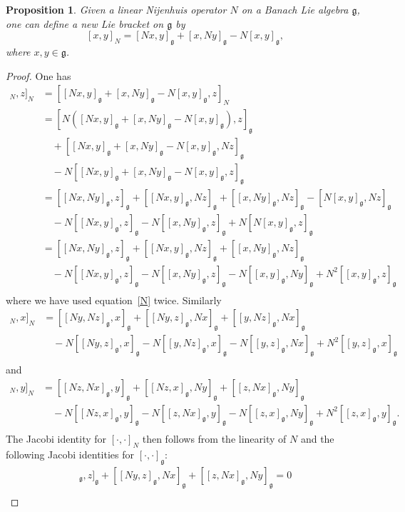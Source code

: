 \documentclass[a4paper,12pt,reqno]{amsart}%
\newtheorem{proposition}[theorem]{Proposition}
\theoremstyle{definition}
\theoremstyle{remark}
\numberwithin{theorem}{section}
\numberwithin{equation}{section}
\newcommand{\1}{{\bf 1}}
\newcommand{\g}{{\mathfrak g}}
\begin{document}
\begin{proposition}
Given a linear Nijenhuis operator $N$ on a Banach Lie algebra $\g$, one can define a new Lie bracket on $\g$ by
\begin{equation}\label{def:N}
    [x, y]_N = [Nx, y]_\g + [x, Ny]_\g - N [x, y]_\g, 
\end{equation}
where $x, y \in \g$.
\end{proposition}
\begin{proof}
    One has
    \begin{align*}
[[x, y]_N, z]_N & = [[Nx, y]_\g + [x, Ny]_\g - N [x, y]_\g, z]_N \\
& = [N\left([Nx, y]_\g + [x, Ny]_\g - N [x, y]_\g\right), z]_\g \\ & \quad+ [[Nx, y]_\g + [x, Ny]_\g - N [x, y]_\g, Nz]_\g \\ & \quad- N[[Nx, y]_\g + [x, Ny]_\g - N [x, y]_\g, z]_\g\\
& = [[Nx, Ny]_\g, z]_\g + [[Nx, y]_\g, Nz]_\g + [[x, Ny]_\g, Nz]_\g - [N [x, y]_\g, Nz]_\g \\ & \quad- N[[Nx, y]_\g, z]_\g - N[[x, Ny]_\g, z]_\g + N[N [x, y]_\g, z]_\g\\
& = [[Nx, Ny]_\g, z]_\g + [[Nx, y]_\g, Nz]_\g + [[x, Ny]_\g, Nz]_\g \\ & \quad- N[[Nx, y]_\g, z]_\g - N[[x, Ny]_\g, z]_\g -N[[x, y]_\g, Ny]_\g + N^2[[x, y]_\g, z]_\g\\
    \end{align*}
    where we have used equation~\eqref{N} twice. 
    Similarly
    \begin{align*}
[[y, z]_N, x]_N & = [[Ny, Nz]_\g, x]_\g + [[Ny, z]_\g, Nx]_\g + [[y, Nz]_\g, Nx]_\g \\ & \quad- N[[Ny, z]_\g, x]_\g - N[[y, Nz]_\g, x]_\g -N[[y, z]_\g, Nx]_\g + N^2[[y, z]_\g, x]_\g\\
    \end{align*}
    and
    \begin{align*}
[[z, x]_N, y]_N & = [[Nz, Nx]_\g, y]_\g + [[Nz, x]_\g, Ny]_\g + [[z, Nx]_\g, Ny]_\g \\ & \quad- N[[Nz, x]_\g, y]_\g - N[[z, Nx]_\g, y]_\g -N[[z, x]_\g, Ny]_\g + N^2[[z, x]_\g, y]_\g.\\
    \end{align*}
    The Jacobi identity for $[\cdot, \cdot]_N$ then follows from the linearity of $N$ and the following Jacobi identities for $[\cdot,\cdot]_\g$:
    \begin{align*}
        [[Nx, Ny]_\g, z]_\g + [[Ny, z]_\g, Nx]_\g + [[z, Nx]_\g, Ny]_\g = 0\\

\end{align*}
\end{proof}
\end{document}
